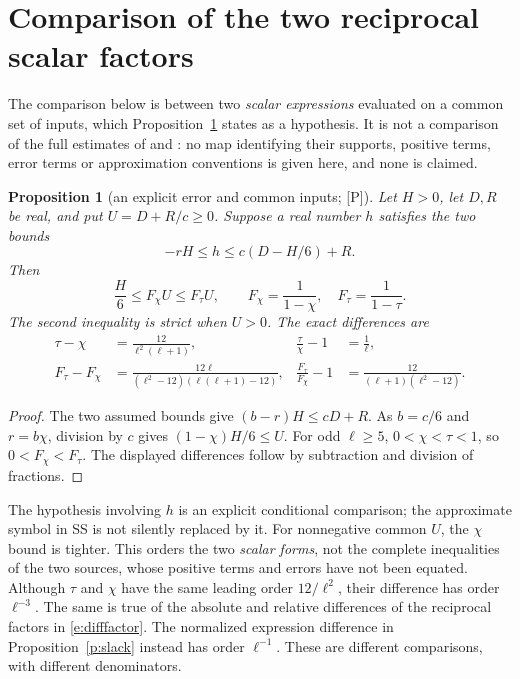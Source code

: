 \documentclass[11pt]{article}
\newtheorem{proposition}{Proposition}
\theoremstyle{remark}
\newcommand{\Pmark}{\textup{[P]}}
\begin{document}
\section{Comparison of the two reciprocal scalar factors}\label{s:order}

The comparison below is between two \emph{scalar expressions} evaluated on a
common set of inputs, which Proposition~\ref{p:bound} states as a hypothesis.
It is not a comparison of the full estimates of \cite{SS} and \cite{IUT4}: no
map identifying their supports, positive terms, error terms or approximation
conventions is given here, and none is claimed.

\begin{proposition}[an explicit error and common inputs; \Pmark]\label{p:bound}
Let $H>0$, let $D,R$ be real, and put $U=D+R/c\ge0$.
Suppose a real number $h$ satisfies the two bounds
\[
 -rH\le h\le c(D-H/6)+R.
\]
Then
\begin{equation}\label{e:strictbound}
 \frac H6\le F_\chi U\le F_\tau U,
 \qquad F_\chi=\frac1{1-\chi},\quad F_\tau=\frac1{1-\tau}.
\end{equation}
The second inequality is strict when $U>0$.  The exact differences are
\begin{align}
 \tau-\chi&=\frac{12}{\ell^2(\ell+1)},&
 \frac\tau\chi-1&=\frac1\ell,\label{e:difftau}\\
 F_\tau-F_\chi&=
 \frac{12\ell}{(\ell^2-12)(\ell(\ell+1)-12)},&
 \frac{F_\tau}{F_\chi}-1&=
 \frac{12}{(\ell+1)(\ell^2-12)}.\label{e:difffactor}
\end{align}
\end{proposition}
\begin{proof}
The two assumed bounds give $(b-r)H\le cD+R$.
As $b=c/6$ and $r=b\chi$, division by $c$ gives
$(1-\chi)H/6\le U$.  For odd $\ell\ge5$,
$0<\chi<\tau<1$, so $0<F_\chi<F_\tau$.
The displayed differences follow by subtraction and division of fractions.
\end{proof}

The hypothesis involving $h$ is an explicit conditional comparison;
the approximate symbol in SS is not silently replaced by it.
For nonnegative common $U$, the $\chi$ bound is tighter.
This orders the two \emph{scalar forms}, not the complete inequalities of
the two sources, whose positive terms and errors have not been equated.
Although $\tau$ and $\chi$ have the same leading order $12/\ell^2$,
their difference has order $\ell^{-3}$.  The same is true of the absolute
and relative differences of the reciprocal factors in
\eqref{e:difffactor}.  The normalized expression difference in
Proposition~\ref{p:slack} instead has order $\ell^{-1}$.
These are different comparisons, with different denominators.
\end{document}
